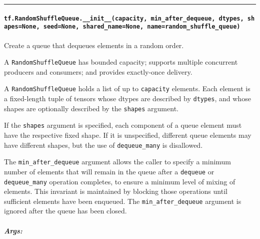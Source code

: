 \begin{center}\rule{0.5\linewidth}{\linethickness}\end{center}

\paragraph{\texorpdfstring{\texttt{tf.RandomShuffleQueue.\_\_init\_\_(capacity,\ min\_after\_dequeue,\ dtypes,\ shapes=None,\ seed=None,\ shared\_name=None,\ name=\textquotesingle{}random\_shuffle\_queue\textquotesingle{})}
}{tf.RandomShuffleQueue.\_\_init\_\_(capacity, min\_after\_dequeue, dtypes, shapes=None, seed=None, shared\_name=None, name='random\_shuffle\_queue') }}\label{tf.randomshufflequeue.ux5fux5finitux5fux5fcapacity-minux5fafterux5fdequeue-dtypes-shapesnone-seednone-sharedux5fnamenone-namerandomux5fshuffleux5fqueue}

Create a queue that dequeues elements in a random order.

A \texttt{RandomShuffleQueue} has bounded capacity; supports multiple
concurrent producers and consumers; and provides exactly-once delivery.

A \texttt{RandomShuffleQueue} holds a list of up to \texttt{capacity}
elements. Each element is a fixed-length tuple of tensors whose dtypes
are described by \texttt{dtypes}, and whose shapes are optionally
described by the \texttt{shapes} argument.

If the \texttt{shapes} argument is specified, each component of a queue
element must have the respective fixed shape. If it is unspecified,
different queue elements may have different shapes, but the use of
\texttt{dequeue\_many} is disallowed.

The \texttt{min\_after\_dequeue} argument allows the caller to specify a
minimum number of elements that will remain in the queue after a
\texttt{dequeue} or \texttt{dequeue\_many} operation completes, to
ensure a minimum level of mixing of elements. This invariant is
maintained by blocking those operations until sufficient elements have
been enqueued. The \texttt{min\_after\_dequeue} argument is ignored
after the queue has been closed.

\subparagraph{Args: }\label{args-55}

